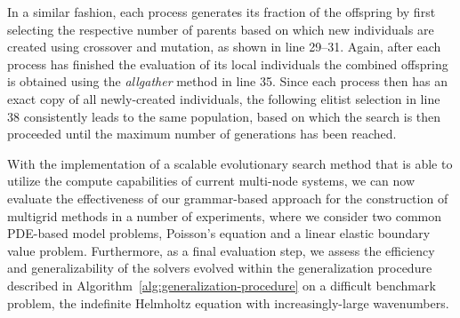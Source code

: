 In a similar fashion, each process generates its fraction of the offspring by first selecting the respective number of parents based on which new individuals are created using crossover and mutation, as shown in line 29--31.
Again, after each process has finished the evaluation of its local individuals the combined offspring is obtained using the \emph{allgather} method in line 35.
Since each process then has an exact copy of all newly-created individuals, the following elitist selection in line 38 consistently leads to the same population, based on which the search is then proceeded until the maximum number of generations has been reached.

With the implementation of a scalable evolutionary search method that is able to utilize the compute capabilities of current multi-node systems, we can now evaluate the effectiveness of our grammar-based approach for the construction of multigrid methods in a number of experiments, where we consider two common PDE-based model problems, Poisson's equation and a linear elastic boundary value problem.
Furthermore, as a final evaluation step, we assess the efficiency and generalizability of the solvers evolved within the generalization procedure described in Algorithm~\ref{alg:generalization-procedure} on a difficult benchmark problem, the indefinite Helmholtz equation with increasingly-large wavenumbers.


